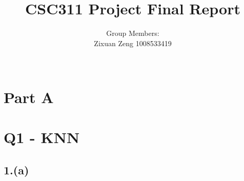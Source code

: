 \documentclass{article}
\title{CSC311 Project Final Report}
\author{Group Members: \\ Zixuan Zeng 1008533419 \\ \\ }
\begin{document}
\maketitle

\section*{Part A}

\section*{Q1 - KNN}

\subsection*{1.(a)}
\end{document}
